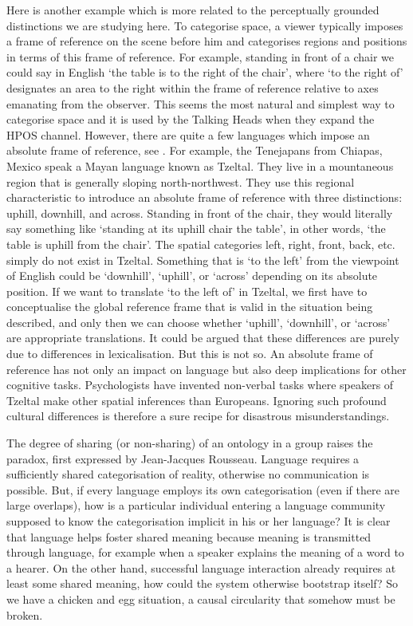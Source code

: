 Here is another example which is more related to 
the perceptually grounded distinctions we 
are studying here. To categorise space, a viewer 
typically imposes a frame of reference 
on the scene before him and categorises regions and positions in
terms of this frame of reference. For example, standing in front of
a chair we could say in English `the table is to the right of the chair', 
where `to the right of' designates an area to the right
within the frame 
of reference relative to axes emanating from the observer. This 
seems the most natural and simplest way to categorise space
and it is used by the Talking Heads when they expand the 
HPOS channel. However, there are quite a few languages
which impose an absolute frame of reference, see \cite{Levinson:2006}. 
For example, the Tenejapans from Chiapas, Mexico 
speak a Mayan language known as
Tzeltal. They live in a mountaneous region that is generally 
sloping north-northwest. They use this regional characteristic
to introduce an absolute frame of reference with three distinctions: 
uphill, downhill, and across. Standing in front of the chair, they 
would literally say something like
`standing at its uphill chair the table', in other words, 
`the table is uphill from the chair'. 
The spatial categories left, right, front, back, etc. simply 
do not exist in Tzeltal.
Something that is `to the left' from the viewpoint
of English could be `downhill', `uphill', or `across' depending
on its absolute position. 
If we want to translate `to the left of' 
in Tzeltal, we first have to conceptualise the global reference
frame that is valid in the situation being described,  
and only then we can choose whether `uphill', `downhill', or `across'   
are appropriate translations. It could be argued that 
these differences are purely due to differences in 
lexicalisation. But this is not so. 
An absolute frame of reference
has not only an impact on language but also deep implications
for other cognitive tasks. Psychologists have invented 
non-verbal tasks where speakers of Tzeltal make other spatial
inferences than Europeans. Ignoring such profound 
cultural differences is therefore a sure recipe for
disastrous misunderstandings.

The degree of sharing (or non-sharing) of an 
ontology in a group raises the paradox, first 
expressed by Jean-Jacques Rousseau. Language requires a
sufficiently shared categorisation of reality, otherwise 
no communication is possible. But, if every language 
employs its own 
categorisation (even if there are large overlaps), how is a
particular individual entering a language community supposed to
know the categorisation implicit in his or her
language? It is clear that language 
helps foster shared meaning because meaning is transmitted 
through language, for example when a speaker explains the meaning
of a word to a hearer. On the other hand, successful 
language interaction already requires at least some shared
meaning, how could the system otherwise bootstrap itself?
So we have a chicken and egg situation, a causal 
circularity that somehow must be broken. 

